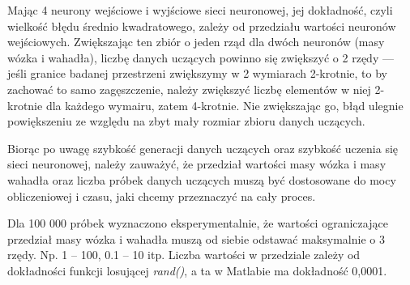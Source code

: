 \documentclass[10pt,a4paper,titlepage]{article}
\begin{document}
	Mając 4 neurony wejściowe i wyjściowe sieci neuronowej, jej dokładność, czyli wielkość błędu średnio kwadratowego, zależy od przedziału wartości neuronów wejściowych. Zwiększając ten zbiór o jeden rząd dla dwóch neuronów (masy wózka i wahadła), liczbę danych uczących powinno się zwiększyć o 2 rzędy --- jeśli granice badanej przestrzeni zwiększymy w 2 wymiarach 2-krotnie, to by zachować to samo zagęszczenie, należy zwiększyć liczbę elementów w niej 2-krotnie dla każdego wymairu, zatem 4-krotnie. Nie zwiększając go, błąd ulegnie powiększeniu ze względu na zbyt mały rozmiar zbioru danych uczących.
	
	Biorąc po uwagę szybkość generacji danych uczących oraz szybkość uczenia się sieci neuronowej, należy zauważyć, że przedział wartości masy wózka i masy wahadła oraz liczba próbek danych uczących muszą być dostosowane do mocy obliczeniowej i czasu, jaki chcemy przeznaczyć na cały proces.
	
	Dla 100 000 próbek wyznaczono eksperymentalnie, że wartości ograniczające przedział masy wózka i wahadła muszą od siebie odstawać maksymalnie o 3 rzędy. Np. 1 -- 100, 0.1 -- 10 itp. Liczba wartości w przedziale zależy od dokładności funkcji losującej \emph{rand()}, a ta w Matlabie ma dokładność 0,0001.
\end{document}
